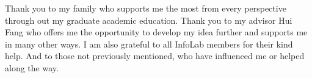 Thank you to my family who supports me the most from every perspective through out my graduate academic education. 
Thank you to my advisor Hui Fang who offers me the opportunity to develop my idea further and supports me in many other ways. 
I am also grateful to all InfoLab members for their kind help. 
And to those not previously mentioned, who have influenced me or helped along the way.
